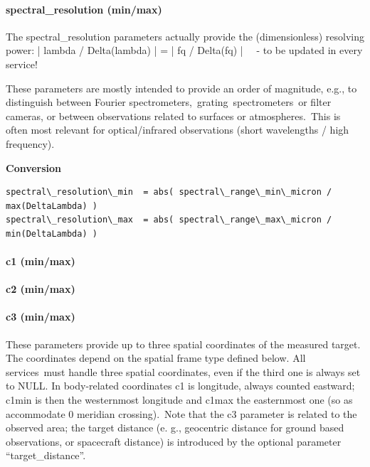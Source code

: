 \documentclass[11pt,a4paper]{ivoa}
\begin{document}
\paragraph{spectral\_resolution (min/max)}

The spectral\_resolution parameters actually provide the (dimensionless) resolving power: | lambda / Delta(lambda) | = | fq / Delta(fq) |   - to be updated in every service!

These parameters are mostly intended to provide an order of magnitude, e.g., to distinguish between Fourier spectrometers, grating spectrometers or filter cameras, or between observations related to surfaces or atmospheres. This is often most relevant for optical/infrared observations (short wavelengths / high frequency).





\textbf{Conversion}




\begin{verbatim}spectral\_resolution\_min  = abs( spectral\_range\_min\_micron / max(DeltaLambda) )
spectral\_resolution\_max  = abs( spectral\_range\_max\_micron / min(DeltaLambda) )\end{verbatim}




\paragraph{c1 (min/max)}

\paragraph{c2 (min/max)}

\paragraph{c3 (min/max)}

These parameters provide up to three spatial coordinates of the measured target. The coordinates depend on the spatial frame type defined below. All services must handle three spatial coordinates, even if the third one is always set to NULL. In body-related coordinates c1 is longitude, always counted eastward; c1min is then the westernmost longitude and c1max the easternmost one (so as accommodate 0 meridian crossing). Note that the c3 parameter is related to the observed area; the target distance (e. g., geocentric distance for ground based observations, or spacecraft distance) is introduced by the optional parameter ``target\_distance''.
\end{document}
